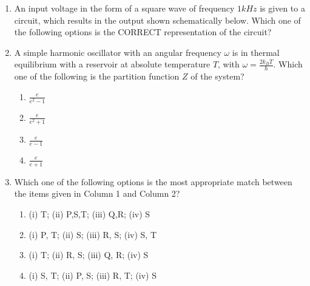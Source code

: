 \documentclass[journal,12pt,onecolumn]{IEEEtran}
\theoremstyle{remark}
\begin{document}
\begin{enumerate}
\item An input voltage in the form of a square wave of frequency $1 kHz$ is given to a circuit, which results in the output shown schematically below. Which one of the following options is the CORRECT representation of the circuit?




\begin{enumerate}
\end{enumerate}

\item A simple harmonic oscillator with an angular frequency $\omega$ is in thermal equilibrium with a reservoir at absolute temperature $T$, with $\omega = \frac{2 k_{B} T}{\hbar}$. Which one of the following is the partition function $Z$ of the system?
\begin{enumerate}
\item $\frac{e}{e^{2} - 1}$
\item $\frac{e}{e^{2}  + 1}$
\item $\frac{e}{e - 1}$
\item $\frac{e}{e + 1}$
\end{enumerate}

\item Which one of the following options is the most appropriate match between the items given in Column 1 and Column 2?



\begin{enumerate}
    \item (i) T; (ii) P,S,T; (iii) Q,R; (iv) S
    \item (i) P, T; (ii) S; (iii) R, S; (iv) S, T
    \item (i) T; (ii) R, S; (iii) Q, R; (iv) S
    \item (i) S, T; (ii) P, S; (iii) R, T; (iv) S
\end{enumerate}


\end{enumerate}
\end{document}
